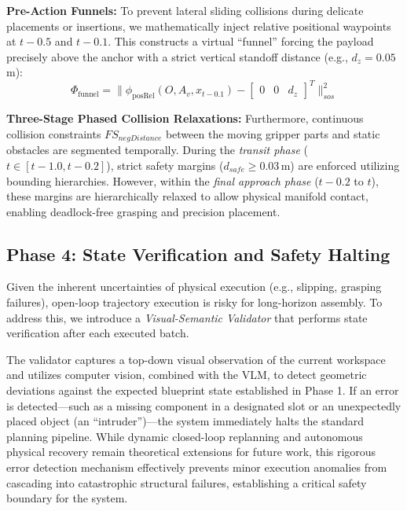 \documentclass[journal]{IEEEtran}
\begin{document}
  \textbf{Pre-Action Funnels:} To prevent lateral sliding collisions during
  delicate placements or insertions, we mathematically inject relative positional
  waypoints at $t-0.5$ and $t-0.1$. This constructs a virtual ``funnel'' forcing
  the payload precisely above the anchor with a strict vertical standoff
  distance (e.g., $d_{z}= 0.05$\,m):
  \begin{equation}
    \Phi_{\text{funnel}}= \| \phi_{\text{posRel}}(O, A_{v}, x_{t-0.1}) -
    \begin{bmatrix}
      0 & 0 & d_{z}
    \end{bmatrix}^{T}\|^{2}_{sos}
  \end{equation}

  \textbf{Three-Stage Phased Collision Relaxations:} Furthermore, continuous
  collision constraints $FS_{negDistance}$ between the moving gripper parts and
  static obstacles are segmented temporally. During the \textit{transit phase} ($t
  \in [t-1.0, t-0 .2]$), strict safety margins ($d_{safe}\ge 0.03$\,m) are enforced
  utilizing bounding hierarchies. However, within the \textit{final approach
  phase} ($t-0.2$ to $t$), these margins are hierarchically relaxed to allow physical
  manifold contact, enabling deadlock-free grasping and precision placement.

  \subsection{Phase 4: State Verification and Safety Halting}
  \label{subsec:phase4} Given the inherent uncertainties of physical execution (e.g.,
  slipping, grasping failures), open-loop trajectory execution is risky for long-horizon
  assembly. To address this, we introduce a \textit{Visual-Semantic Validator} that
  performs state verification after each executed batch.

  The validator captures a top-down visual observation of the current workspace and
  utilizes computer vision, combined with the VLM, to detect geometric deviations
  against the expected blueprint state established in Phase 1. If an error is detected---such
  as a missing component in a designated slot or an unexpectedly placed object (an
  ``intruder'')---the system immediately halts the standard planning pipeline.
  While dynamic closed-loop replanning and autonomous physical recovery remain
  theoretical extensions for future work, this rigorous error detection mechanism
  effectively prevents minor execution anomalies from cascading into catastrophic
  structural failures, establishing a critical safety boundary for the system.
\end{document}
